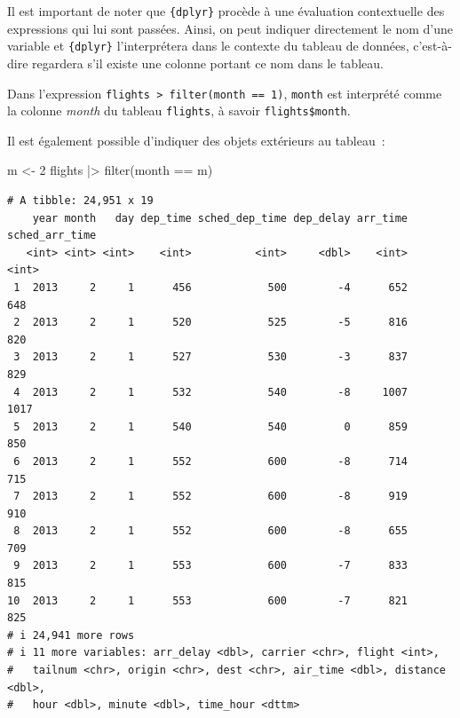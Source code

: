 \documentclass[
  letterpaper,
  DIV=11,
  numbers=noendperiod,
  oneside]{scrreprt}
\newenvironment{Shaded}{\begin{snugshade}}{\end{snugshade}}
\newcommand{\DecValTok}[1]{\textcolor[rgb]{0.68,0.00,0.00}{#1}}
\newcommand{\FunctionTok}[1]{\textcolor[rgb]{0.28,0.35,0.67}{#1}}
\newcommand{\NormalTok}[1]{\textcolor[rgb]{0.00,0.23,0.31}{#1}}
\newcommand{\OtherTok}[1]{\textcolor[rgb]{0.00,0.23,0.31}{#1}}
\newcommand{\SpecialCharTok}[1]{\textcolor[rgb]{0.37,0.37,0.37}{#1}}
\begin{document}
\begin{tcolorbox}[enhanced jigsaw, colbacktitle=quarto-callout-tip-color!10!white, opacityback=0, toprule=.15mm, colback=white, coltitle=black, bottomtitle=1mm, toptitle=1mm, titlerule=0mm, rightrule=.15mm, title=\textcolor{quarto-callout-tip-color}{\faLightbulb}\hspace{0.5em}{Évaluation contextuelle}, breakable, bottomrule=.15mm, opacitybacktitle=0.6, arc=.35mm, left=2mm, leftrule=.75mm, colframe=quarto-callout-tip-color-frame]

Il est important de noter que \texttt{\{dplyr\}} procède à une
évaluation contextuelle des expressions qui lui sont passées. Ainsi, on
peut indiquer directement le nom d'une variable et \texttt{\{dplyr\}}
l'interprétera dans le contexte du tableau de données, c'est-à-dire
regardera s'il existe une colonne portant ce nom dans le tableau.

Dans l'expression
\texttt{flights\ \textbar{}\textgreater{}\ filter(month\ ==\ 1)},
\texttt{month} est interprété comme la colonne \emph{month} du tableau
\texttt{flights}, à savoir \texttt{flights\$month}.

Il est également possible d'indiquer des objets extérieurs au tableau~:

\begin{Shaded}
\begin{Highlighting}[]
\NormalTok{m }\OtherTok{\textless{}{-}} \DecValTok{2}
\NormalTok{flights }\SpecialCharTok{|\textgreater{}} 
  \FunctionTok{filter}\NormalTok{(month }\SpecialCharTok{==}\NormalTok{ m)}
\end{Highlighting}
\end{Shaded}

\begin{verbatim}
# A tibble: 24,951 x 19
    year month   day dep_time sched_dep_time dep_delay arr_time sched_arr_time
   <int> <int> <int>    <int>          <int>     <dbl>    <int>          <int>
 1  2013     2     1      456            500        -4      652            648
 2  2013     2     1      520            525        -5      816            820
 3  2013     2     1      527            530        -3      837            829
 4  2013     2     1      532            540        -8     1007           1017
 5  2013     2     1      540            540         0      859            850
 6  2013     2     1      552            600        -8      714            715
 7  2013     2     1      552            600        -8      919            910
 8  2013     2     1      552            600        -8      655            709
 9  2013     2     1      553            600        -7      833            815
10  2013     2     1      553            600        -7      821            825
# i 24,941 more rows
# i 11 more variables: arr_delay <dbl>, carrier <chr>, flight <int>,
#   tailnum <chr>, origin <chr>, dest <chr>, air_time <dbl>, distance <dbl>,
#   hour <dbl>, minute <dbl>, time_hour <dttm>
\end{verbatim}


\end{tcolorbox}
\end{document}
